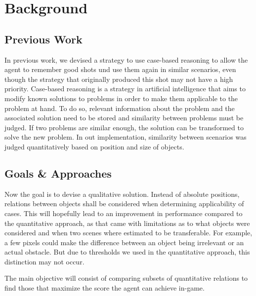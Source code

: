 \section{Background}\label{sec:background}
\cite{tur38}

\subsection{Previous Work}
In previous work, we devised a strategy to use case-based reasoning to allow the agent to remember good shots und use them again in similar scenarios, even though the strategy that originally produced this shot may not have a high priority.
Case-based reasoning is a strategy in artificial intelligence that aims to modify known solutions to problems in order to make them applicable to the problem at hand.
To do so, relevant information about the problem and the associated solution need to be stored and similarity between problems must be judged.
If two problems are similar enough, the solution can be transformed to solve the new problem.
In out implementation, similarity between scenarios was judged quantitatively based on position and size of objects.


\subsection{Goals \& Approaches}

Now the goal is to devise a qualitative solution.
Instead of absolute positions, relations between objects shall be considered when determining applicability of cases.
This will hopefully lead to an improvement in performance compared to the quantitative approach, as that came with limitations as to what objects were considered and when two scenes where estimated to be transferable. %
For example, a few pixels could make the difference between an object being irrelevant or an actual obstacle.
But due to thresholds we used in the quantitative approach, this distinction may not occur. %

The main objective will consist of comparing subsets of quantitative relations to find those that maximize the score the agent can achieve in-game. %

